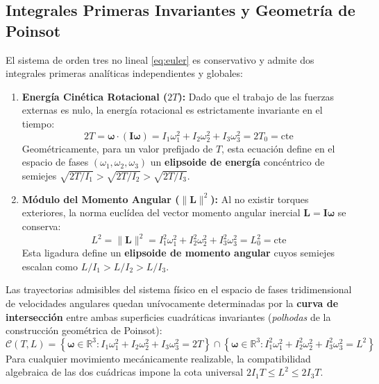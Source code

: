 \documentclass[11pt, a4paper]{article}
\begin{document}
\subsection{Integrales Primeras Invariantes y Geometría de Poinsot}
El sistema de orden tres no lineal \eqref{eq:euler} es conservativo y admite dos integrales primeras analíticas independientes y globales:
\begin{enumerate}[leftmargin=*]
    \item \textbf{Energía Cinética Rotacional ($2T$):} Dado que el trabajo de las fuerzas externas es nulo, la energía rotacional es estrictamente invariante en el tiempo:
    \begin{equation}
    2T = \boldsymbol{\omega} \cdot (\mathbf{I}\boldsymbol{\omega}) = I_1 \omega_1^2 + I_2 \omega_2^2 + I_3 \omega_3^2 = 2T_0 = \text{cte}
    \end{equation}
    Geométricamente, para un valor prefijado de $T$, esta ecuación define en el espacio de fases $(\omega_1, \omega_2, \omega_3)$ un \textbf{elipsoide de energía} concéntrico de semiejes $\sqrt{2T/I_1} > \sqrt{2T/I_2} > \sqrt{2T/I_3}$.
    \item \textbf{Módulo del Momento Angular ($\|\mathbf{L}\|^2$):} Al no existir torques exteriores, la norma euclídea del vector momento angular inercial $\mathbf{L} = \mathbf{I}\boldsymbol{\omega}$ se conserva:
    \begin{equation}
    L^2 = \|\mathbf{L}\|^2 = I_1^2 \omega_1^2 + I_2^2 \omega_2^2 + I_3^2 \omega_3^2 = L_0^2 = \text{cte}
    \end{equation}
    Esta ligadura define un \textbf{elipsoide de momento angular} cuyos semiejes escalan como $L/I_1 > L/I_2 > L/I_3$.
\end{enumerate}

Las trayectorias admisibles del sistema físico en el espacio de fases tridimensional de velocidades angulares quedan unívocamente determinadas por la \textbf{curva de intersección} entre ambas superficies cuadráticas invariantes (\textit{polhodas} de la construcción geométrica de Poinsot):
\begin{equation}
\mathcal{C}(T, L) = \left\{ \boldsymbol{\omega} \in \mathbb{R}^3 : I_1 \omega_1^2 + I_2 \omega_2^2 + I_3 \omega_3^2 = 2T \right\} \cap \left\{ \boldsymbol{\omega} \in \mathbb{R}^3 : I_1^2 \omega_1^2 + I_2^2 \omega_2^2 + I_3^2 \omega_3^2 = L^2 \right\}
\end{equation}
Para cualquier movimiento mecánicamente realizable, la compatibilidad algebraica de las dos cuádricas impone la cota universal $2 I_1 T \le L^2 \le 2 I_3 T$.
\end{document}
